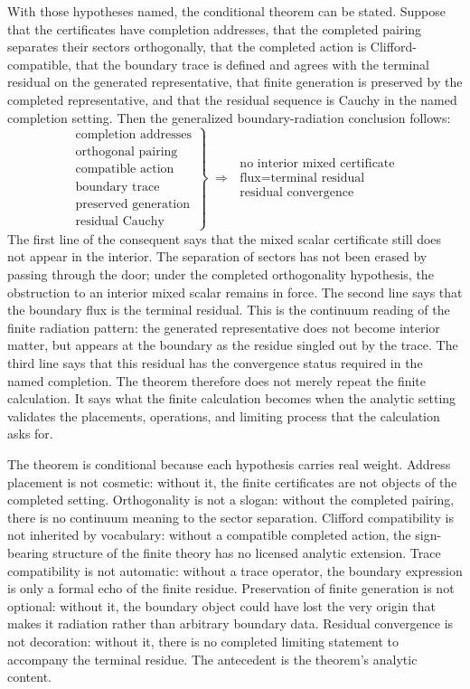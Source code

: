 With those hypotheses named, the conditional theorem can be stated. Suppose that
the certificates have completion addresses, that the completed pairing separates
their sectors orthogonally, that the completed action is Clifford-compatible,
that the boundary trace is defined and agrees with the terminal residual on the
generated representative, that finite generation is preserved by the completed
representative, and that the residual sequence is Cauchy in the named completion
setting. Then the generalized boundary-radiation conclusion follows:
\[
  \left.
  \begin{array}{l}
    \text{completion addresses} \\
    \text{orthogonal pairing} \\
    \text{compatible action} \\
    \text{boundary trace} \\
    \text{preserved generation} \\
    \text{residual Cauchy}
  \end{array}
  \right\}
  \;\Longrightarrow\;
  \begin{array}{l}
    \text{no interior mixed certificate} \\
    \text{flux} = \text{terminal residual} \\
    \text{residual convergence}
  \end{array}
\]
The first line of the consequent says that the mixed scalar certificate still
does not appear in the interior. The separation of sectors has not been erased by
passing through the door; under the completed orthogonality hypothesis, the
obstruction to an interior mixed scalar remains in force. The second line says
that the boundary flux is the terminal residual. This is the continuum reading of
the finite radiation pattern: the generated representative does not become
interior matter, but appears at the boundary as the residue singled out by the
trace. The third line says that this residual has the convergence status required
in the named completion. The theorem therefore does not merely repeat the finite
calculation. It says what the finite calculation becomes when the analytic
setting validates the placements, operations, and limiting process that the
calculation asks for.

The theorem is conditional because each hypothesis carries real weight. Address
placement is not cosmetic: without it, the finite certificates
are not objects of the completed setting. Orthogonality is not a slogan: without
the completed pairing, there is no continuum meaning to the sector separation.
Clifford compatibility is not inherited by vocabulary: without a compatible
completed action, the sign-bearing structure of the finite theory has no
licensed analytic extension. Trace compatibility is not automatic: without a
trace operator, the boundary expression is only a formal echo of the finite
residue. Preservation of finite generation is not optional: without it, the
boundary object could have lost the very origin that makes it radiation rather
than arbitrary boundary data. Residual convergence is not decoration: without
it, there is no completed limiting statement to accompany the terminal residue.
The antecedent is the theorem's analytic content.

